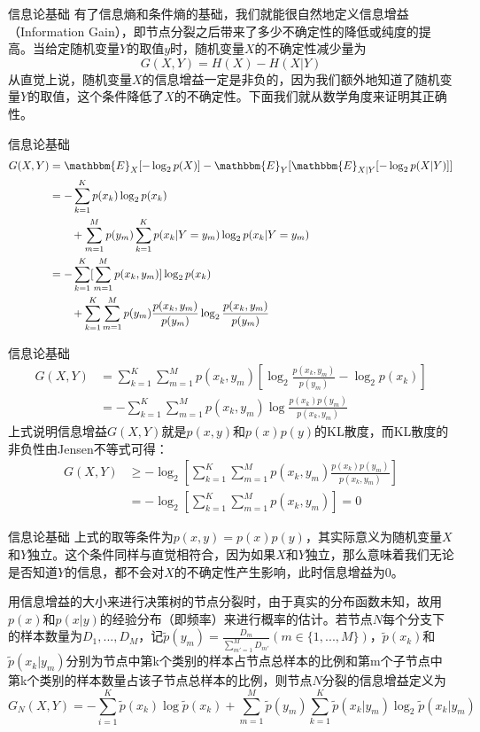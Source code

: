 \documentclass{ctexbeamer}        %
\begin{document}
\begin{frame}{信息论基础}
有了信息熵和条件熵的基础，我们就能很自然地定义信息增益（Information Gain），即节点分裂之后带来了多少不确定性的降低或纯度的提高。当给定随机变量$Y$的取值$y$时，随机变量$X$的不确定性减少量为
$$
G(X,Y)=H(X)-H(X\vert Y)
$$
从直觉上说，随机变量$X$的信息增益一定是非负的，因为我们额外地知道了随机变量$Y$的取值，这个条件降低了$X$的不确定性。下面我们就从数学角度来证明其正确性。
\end{frame}

\begin{frame}{信息论基础}
\begin{align*}
G(X,Y)&=\mathbbm{E}_{X}[-\log_2p(X)]-\mathbbm{E}_{Y}[\mathbbm{E}_{X\vert Y}[-\log_2p(X\vert Y)]]\\
&=-\sum_{k=1}^Kp(x_k)\log_2p(x_k) \\
&\qquad+\sum_{m=1}^Mp(y_m)\sum_{k=1}^K p(x_k\vert Y=y_m)\log_2p(x_k\vert Y=y_m) \\
&=-\sum_{k=1}^K[\sum_{m=1}^Mp(x_k, y_m)]\log_2p(x_k) \\
&\qquad+\sum_{k=1}^K\sum_{m=1}^M p(y_m)\frac{p(x_k, y_m)}{p(y_m)}\log_2\frac{p(x_k, y_m)}{p(y_m)}
\end{align*}
\end{frame}
\begin{frame}{信息论基础}
\begin{align*}
G(X,Y)&=\sum_{k=1}^K\sum_{m=1}^Mp(x_k,y_m)[\log_2\frac{p(x_k, y_m)}{p(y_m)}-\log_2p(x_k)] \\
&=-\sum_{k=1}^K\sum_{m=1}^M p(x_k,y_m) \log\frac{p(x_k)p(y_m)}{p(x_k, y_m)}
\end{align*}
上式说明信息增益$G(X,Y)$就是$p(x,y)$和$p(x)p(y)$的KL散度，而KL散度的非负性由Jensen不等式可得：
\begin{align*}
G(X,Y)&\geq -\log_2 [\sum_{k=1}^K\sum_{m=1}^M p(x_k,y_m)\frac{p(x_k)p(y_m)}{p(x_k, y_m)}]\\
&= -\log_2 [\sum_{k=1}^K\sum_{m=1}^Mp(x_k,y_m)] = 0
\end{align*}
\end{frame}

\begin{frame}{信息论基础}
上式的取等条件为$p(x,y)=p(x)p(y)$，其实际意义为随机变量$X$和$Y$独立。这个条件同样与直觉相符合，因为如果$X$和$Y$独立，那么意味着我们无论是否知道$Y$的信息，都不会对$X$的不确定性产生影响，此时信息增益为0。
\newline

用信息增益的大小来进行决策树的节点分裂时，由于真实的分布函数未知，故用$p(x)$和$p(x\vert y)$的经验分布（即频率）来进行概率的估计。若节点$N$每个分支下的样本数量为$D_1,...,D_M$，记$\tilde{p}(y_m)=\frac{D_m}{\sum_{m'=1}^M D_{m'}}(m\in\{1,...,M\})$，$\tilde{p}(x_k)$和$\tilde{p}(x_k\vert y_m)$分别为节点中第k个类别的样本占节点总样本的比例和第m个子节点中第k个类别的样本数量占该子节点总样本的比例，则节点$N$分裂的信息增益定义为
{\small
$$
G_N(X,Y)=-\sum_{i=1}^K\tilde{p}(x_k)\log \tilde{p}(x_k)+\sum_{m=1}^M\tilde{p}(y_m)\sum_{k=1}^K\tilde{p}(x_k\vert y_m)\log_2 \tilde{p}(x_k\vert y_m)
$$
}

\end{frame}
\end{document}
